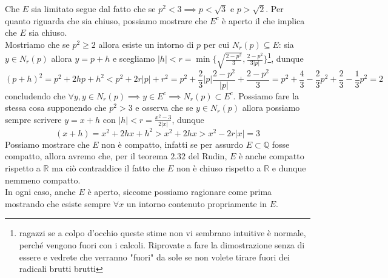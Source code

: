\documentclass{report}
\begin{document}
\begin{mysolution}
	Che $E$ sia limitato segue dal fatto che se $p^2 < 3 \implies p < \sqrt{3}$ e $p > \sqrt{2}$. Per quanto riguarda che sia chiuso, possiamo mostrare che $E^c$ è aperto il che implica che $E$ sia chiuso. \\
	Mostriamo che se $p^2 \geq 2$ allora esiste un intorno di $p$ per cui $N_r(p) \subseteq E$: sia $y \in N_r(p)$ allora $y = p+h$ e scegliamo $|h| < r=\min\{\sqrt{\frac{2-p^2}{3}}, \frac{2-p^2}{3|p|}\}$\footnote{ragazzi se a colpo d'occhio queste stime non vi sembrano intuitive è normale, perché vengono fuori con i calcoli. Riprovate a fare la dimostrazione senza di essere e vedrete che verranno "fuori" da sole se non volete tirare fuori dei radicali brutti brutti}, dunque $$
(p+h)^2 = p^2 + 2hp + h^2 < p^2 + 2r |p| + r^2 = p^2 + \frac{2}{3} |p| \frac{2-p^2}{|p|} + \frac{2-p^2}{3} = p^2 + \frac{4}{3} - \frac{2}{3}p^2 + \frac{2}{3} - \frac{1}{3}p^2 = 2	
$$
concludendo che $\forall y, y \in N_r(p) \implies y \in E^c \implies N_r(p) \subset E^c$. Possiamo fare la stessa cosa supponendo che $p^2 > 3$ e osserva che se $y \in N_r(p)$ allora possiamo sempre scrivere $y=x+h$ con $|h| < r=\frac{x^2-3}{2|x|}$, dunque
$$
(x+h) = x^2 + 2hx + h^2 > x^2 + 2hx > x^2 - 2 r |x| = 3
$$
\noindent Possiamo mostrare che $E$ non è compatto, infatti se per assurdo $E \subset \mathbb{Q}$ fosse compatto, allora avremo che, per il teorema $2.32$ del Rudin, $E$ è anche compatto rispetto a $\mathbb{R}$ ma ciò contraddice il fatto che $E$ non è chiuso rispetto a $\mathbb{R}$ e dunque nemmeno compatto. \\
	In ogni caso, anche $E$ è aperto, siccome possiamo ragionare come prima mostrando che esiste sempre $\forall x$ un intorno contenuto propriamente in $E$.
\end{mysolution}
\end{document}

